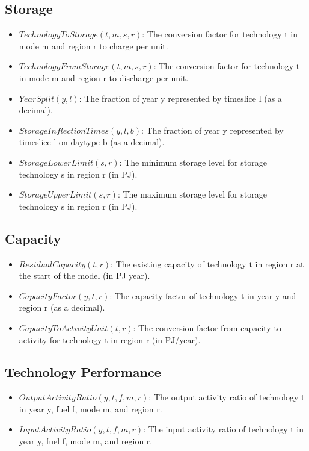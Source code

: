 \documentclass[11pt]{article}
\begin{document}
\subsection{Storage}
\begin{itemize}
    \item $TechnologyToStorage(t,m,s,r)$: The conversion factor for technology t in mode m and region r to charge per unit.
    \item $TechnologyFromStorage(t,m,s,r)$: The conversion factor for technology t in mode m and region r to discharge per unit.
    \item $YearSplit(y,l)$: The fraction of year y represented by timeslice l (as a decimal).
    \item $StorageInflectionTimes(y,l,b)$: The fraction of year y represented by timeslice l on daytype b (as a decimal).
    \item $StorageLowerLimit(s,r)$: The minimum storage level for storage technology s in region r (in PJ).
    \item $StorageUpperLimit(s,r)$: The maximum storage level for storage technology s in region r (in PJ).
\end{itemize}

\subsection{Capacity}
\begin{itemize}
    \item $ResidualCapacity(t,r)$: The existing capacity of technology t in region r at the start of the model (in PJ year).
    \item $CapacityFactor(y,t,r)$: The capacity factor of technology t in year y and region r (as a decimal).
    \item $CapacityToActivityUnit(t,r)$: The conversion factor from capacity to activity for technology t in region r (in PJ/year).
\end{itemize}


\subsection{Technology Performance}
\begin{itemize}
    \item $OutputActivityRatio(y,t,f,m,r)$: The output activity ratio of technology t in year y, fuel f, mode m, and region r.
    \item $InputActivityRatio(y,t,f,m,r)$: The input activity ratio of technology t in year y, fuel f, mode m, and region r.
\end{itemize}
\end{document}
